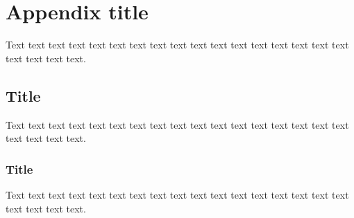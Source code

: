 \documentclass[preprint]{iucr}              %
\begin{document}
\appendix
\section{Appendix title}

Text text text text text text text text text text text text text text
text text text text text text text.

\subsection{Title}

Text text text text text text text text text text text text text text
text text text text text text text.

\subsubsection{Title}

Text text text text text text text text text text text text text text
text text text text text text text.









\end{document}

